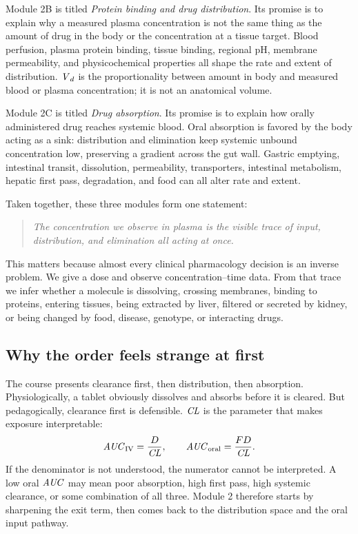 \documentclass[a4paper]{article}
\newcommand{\CL}{\ensuremath{\pksym{CL}}}
\newcommand{\Vd}{\ensuremath{\pksym{V}_d}}
\newcommand{\AUC}{\ensuremath{\pksym{AUC}}}
\newcommand{\Fbio}{\ensuremath{F}}
\begin{document}
Module 2B is titled \emph{Protein binding and drug distribution}. Its promise is to explain why a measured plasma concentration is not the same thing as the amount of drug in the body or the concentration at a tissue target. Blood perfusion, plasma protein binding, tissue binding, regional pH, membrane permeability, and physicochemical properties all shape the rate and extent of distribution. \Vd{} is the proportionality between amount in body and measured blood or plasma concentration; it is not an anatomical volume.

Module 2C is titled \emph{Drug absorption}. Its promise is to explain how orally administered drug reaches systemic blood. Oral absorption is favored by the body acting as a sink: distribution and elimination keep systemic unbound concentration low, preserving a gradient across the gut wall. Gastric emptying, intestinal transit, dissolution, permeability, transporters, intestinal metabolism, hepatic first pass, degradation, and food can all alter rate and extent.

Taken together, these three modules form one statement:
\begin{quote}
\itshape
The concentration we observe in plasma is the visible trace of input, distribution, and elimination all acting at once.
\end{quote}
This matters because almost every clinical pharmacology decision is an inverse problem. We give a dose and observe concentration--time data. From that trace we infer whether a molecule is dissolving, crossing membranes, binding to proteins, entering tissues, being extracted by liver, filtered or secreted by kidney, or being changed by food, disease, genotype, or interacting drugs.

\subsection{Why the order feels strange at first}

The course presents clearance first, then distribution, then absorption. Physiologically, a tablet obviously dissolves and absorbs before it is cleared. But pedagogically, clearance first is defensible. \CL{} is the parameter that makes exposure interpretable:
\[
  \AUC_{\pklab{IV}}=\frac{D}{\CL},
  \qquad
  \AUC_{\pklab{oral}}=\frac{\Fbio D}{\CL}.
\]
If the denominator is not understood, the numerator cannot be interpreted. A low oral \AUC{} may mean poor absorption, high first pass, high systemic clearance, or some combination of all three. Module 2 therefore starts by sharpening the exit term, then comes back to the distribution space and the oral input pathway.
\end{document}
